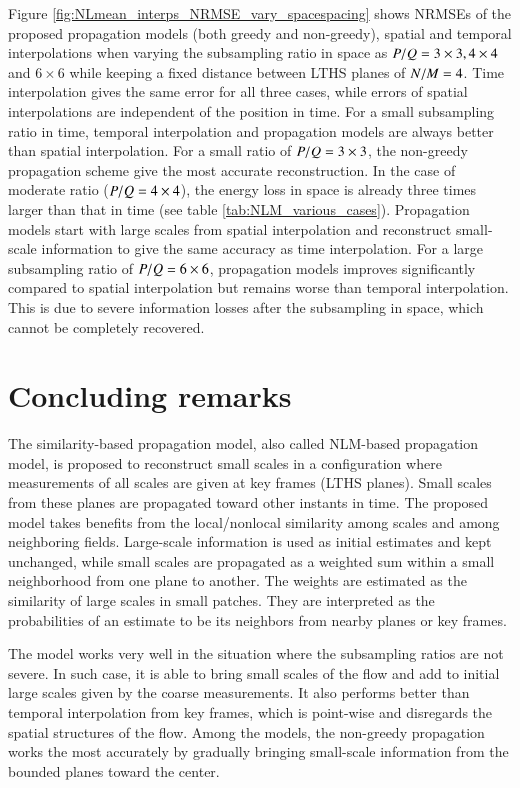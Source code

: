 Figure \ref{fig:NLmean_interps_NRMSE_vary_spacespacing} shows NRMSEs of the proposed propagation models (both greedy and non-greedy), spatial and temporal interpolations when varying the subsampling ratio in space as $ P/Q = 3 \times 3, 4 \times 4 $ and $ 6 \times 6 $ while keeping a fixed distance between LTHS planes of $ N/M=4 $. Time interpolation gives the same error for all three cases, while errors of spatial interpolations are independent of the position in time. For a small subsampling ratio in time, temporal interpolation and propagation models are always better than spatial interpolation. For a small ratio of $ P/Q = 3 \times 3 $, the non-greedy propagation scheme give the most accurate reconstruction. In the case of moderate ratio ($ P/Q=4 \times 4 $), the energy loss in space is already three times larger than that in time (see table \ref{tab:NLM_various_cases}). Propagation models start with large scales from spatial interpolation and reconstruct small-scale information to give the same accuracy as time interpolation. For a large subsampling ratio of $ P/Q = 6 \times 6 $, propagation models improves significantly compared to spatial interpolation but remains worse than temporal interpolation. This is due to severe information losses after the subsampling in space, which cannot be  completely recovered.

\section{Concluding remarks}
The similarity-based propagation model, also called NLM-based propagation model, is proposed to reconstruct small scales in a configuration where measurements of all scales are given at key frames (LTHS planes). Small scales from these planes are propagated toward other instants in time. The proposed model takes benefits from the local/nonlocal similarity among scales and  among neighboring fields. Large-scale information is used as initial estimates and kept unchanged, while small scales are propagated as a weighted sum within a small neighborhood from one plane to another. The weights are estimated as the similarity of large scales in small patches. They are interpreted as the probabilities of an estimate to be its neighbors from nearby planes or key frames. 

The model works very well in the situation where the subsampling ratios are not severe. In such case, it is able to bring small scales of the flow and add to initial large scales given by the coarse measurements. It also performs better than temporal interpolation from key frames, which is point-wise and disregards the spatial structures of the flow. Among the models, the non-greedy propagation works the most accurately by gradually bringing small-scale information from the bounded planes toward the center. 

